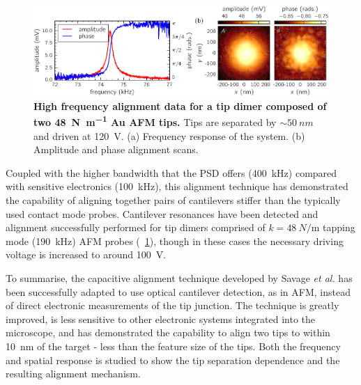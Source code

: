 \documentclass{article}
\begin{document}
\begin{figure}[h]
\centering
\includegraphics{figures/hf_alignment_data}
\caption[High frequency alignment data for a tip dimer composed of two \SI{48}{N\per\metre} Au AFM tips]{\textbf{High frequency alignment data for a tip dimer composed of two \SI{48}{N\per\metre} Au AFM tips.} Tips are separated by $\sim\SI{50}{nm}$ and driven at \SI{120}{V}. (a) Frequency response of the system. (b) Amplitude and phase alignment scans.}
\label{fig:hf_alignment_data} 
\end{figure}

Coupled with the higher bandwidth that the PSD offers (\SI{400}{kHz}) compared with sensitive electronics (\SI{100}{kHz}), this alignment technique has demonstrated the capability of aligning together pairs of cantilevers stiffer than the typically used contact mode probes. Cantilever resonances have been detected and alignment successfully performed for tip dimers comprised of $k=\SI{48}{N\per\metre}$ tapping mode (\SI{190}{kHz}) AFM probes (\figurename~\ref{fig:hf_alignment_data}), though in these cases the necessary driving voltage is increased to around \SI{100}{V}.

To summarise, the capacitive alignment technique developed by Savage \textit{et al.} \cite{savage2011} has been successfully adapted to use optical cantilever detection, as in AFM, instead of direct electronic measurements of the tip junction. The technique is greatly improved, is less sensitive to other electronic systems integrated into the microscope, and has demonstrated the capability to align two tips to within \SI{10}{nm} of the target - less than the feature size of the tips. Both the frequency and spatial response is studied to show the tip separation dependence and the resulting alignment mechanism.
\end{document}
